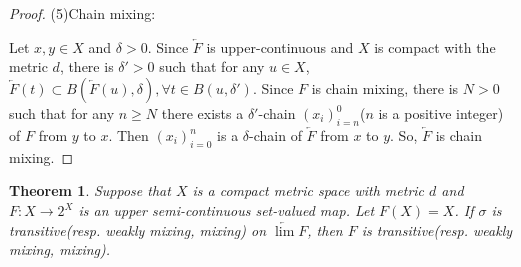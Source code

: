\documentclass[12pt]{amsart}
\newtheorem{theorem}{Theorem}[section]
\theoremstyle{definition}
\begin{document}
\begin{proof}
	(5)Chain mixing:
	
	{Let $x,y\in X$ and $\delta>0$. Since $\underleftarrow{F}$ is upper-continuous and $X$ is compact with the metric $d$, there is $\delta'>0$ such that for any $u\in X$, $\underleftarrow{F}(t)\subset B(\underleftarrow{F}(u),\delta), \forall t\in B(u,\delta')$.
		Since $F$ is chain mixing, there is $N>0$ such that for any $n\geq N$ there exists a $\delta'$-chain $(x_i)^0_{i=n}$($n$ is a positive integer) of $F$ from $y$ to $x$. Then $(x_i)^n_{i=0}$ is a $\delta$-chain of $\underleftarrow{F}$ from $x$ to $y$. So, $\underleftarrow{F}$ is chain mixing.}
\end{proof}

\begin{theorem}\label{them4}
	Suppose that $X$ is a compact metric space with metric $d$ and $F:X\rightarrow 2^X$ is an upper semi-continuous set-valued map. Let $F(X)=X$. {If $\sigma$ is transitive(resp. weakly mixing, mixing) on $\underleftarrow{\lim} F$, then $F$ is transitive(resp. weakly mixing, mixing).}
\end{theorem}
\end{document}
